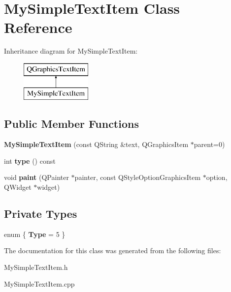 \hypertarget{class_my_simple_text_item}{}\section{My\+Simple\+Text\+Item Class Reference}
\label{class_my_simple_text_item}
Inheritance diagram for My\+Simple\+Text\+Item\+:\begin{figure}[H]
\begin{center}
\leavevmode
\includegraphics[height=2.000000cm]{class_my_simple_text_item}
\end{center}
\end{figure}
\subsection*{Public Member Functions}
\begin{DoxyCompactItemize}
\item 
\hypertarget{class_my_simple_text_item_abcb188d82eae8c094d053c30f414e5f7}{}{\bfseries My\+Simple\+Text\+Item} (const Q\+String \&text, Q\+Graphics\+Item $\ast$parent=0)\label{class_my_simple_text_item_abcb188d82eae8c094d053c30f414e5f7}

\item 
\hypertarget{class_my_simple_text_item_acdb1382024e54a67c89b887b5ec67f47}{}int {\bfseries type} () const \label{class_my_simple_text_item_acdb1382024e54a67c89b887b5ec67f47}

\item 
\hypertarget{class_my_simple_text_item_a470357b08ba50dff3c95934f75be294c}{}void {\bfseries paint} (Q\+Painter $\ast$painter, const Q\+Style\+Option\+Graphics\+Item $\ast$option, Q\+Widget $\ast$widget)\label{class_my_simple_text_item_a470357b08ba50dff3c95934f75be294c}

\end{DoxyCompactItemize}
\subsection*{Private Types}
\begin{DoxyCompactItemize}
\item 
\hypertarget{class_my_simple_text_item_a6483b53c725f5e46bc9e9ba16ee909e3}{}enum \{ {\bfseries Type} = 5
 \}\label{class_my_simple_text_item_a6483b53c725f5e46bc9e9ba16ee909e3}

\end{DoxyCompactItemize}


The documentation for this class was generated from the following files\+:\begin{DoxyCompactItemize}
\item 
My\+Simple\+Text\+Item.\+h\item 
My\+Simple\+Text\+Item.\+cpp\end{DoxyCompactItemize}

